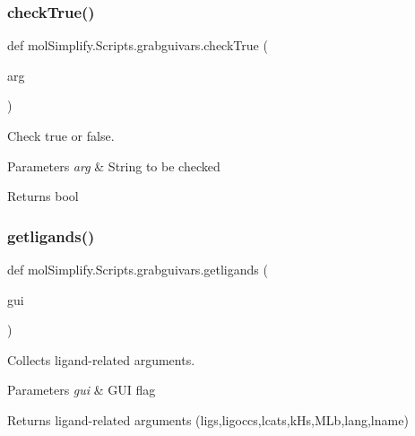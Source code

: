 \subsubsection{\texorpdfstring{check\+True()}{checkTrue()}}
{\footnotesize\ttfamily def mol\+Simplify.\+Scripts.\+grabguivars.\+check\+True (\begin{DoxyParamCaption}\item[{}]{arg }\end{DoxyParamCaption})}



Check true or false. 


\begin{DoxyParams}{Parameters}
{\em arg} & String to be checked \\
\hline
\end{DoxyParams}
\begin{DoxyReturn}{Returns}
bool 
\end{DoxyReturn}
\mbox{\label{namespacemolSimplify_1_1Scripts_1_1grabguivars_a872962bfed51e6ca90b81fe291cd56b5}} 
\subsubsection{\texorpdfstring{getligands()}{getligands()}}
{\footnotesize\ttfamily def mol\+Simplify.\+Scripts.\+grabguivars.\+getligands (\begin{DoxyParamCaption}\item[{}]{gui }\end{DoxyParamCaption})}



Collects ligand-\/related arguments. 


\begin{DoxyParams}{Parameters}
{\em gui} & G\+UI flag \\
\hline
\end{DoxyParams}
\begin{DoxyReturn}{Returns}
ligand-\/related arguments (ligs,ligoccs,lcats,k\+Hs,M\+Lb,lang,lname) 
\end{DoxyReturn}
\mbox{\label{namespacemolSimplify_1_1Scripts_1_1grabguivars_a4c50a9abcb313dc01c842d88a193bf57}} 
